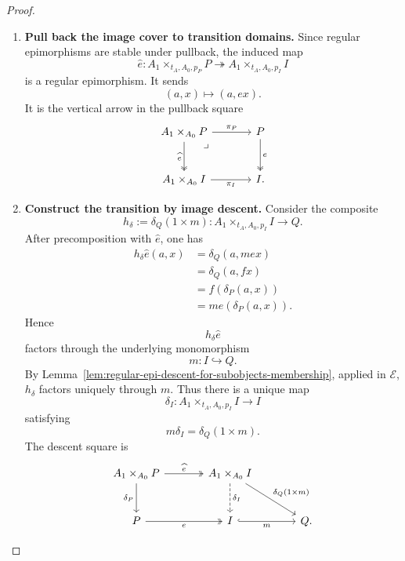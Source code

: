 \begin{proof}
    \leavevmode
    \begin{enumerate}
        \item \textbf{Pull back the image cover to transition domains.}
        Since regular epimorphisms are stable under pullback, the induced map
        \[
            \widehat e:
            A_1\times_{t_A,A_0,p_P}P
            \twoheadrightarrow
            A_1\times_{t_A,A_0,p_I}I
        \]
        is a regular epimorphism. It sends
        \[
            (a,x)\longmapsto(a,ex).
        \]
        It is the vertical arrow in the pullback square
        \[
        \begin{tikzcd}[column sep=large, row sep=large]
            A_1\times_{A_0}P
                \arrow[r, "\pi_P"]
                \arrow[d, two heads, "\widehat e"']
                \arrow[dr, phantom, "\lrcorner", very near start]
            &
            P
                \arrow[d, two heads, "e"]
            \\
            A_1\times_{A_0}I
                \arrow[r, "\pi_I"']
            &
            I .
        \end{tikzcd}
        \]

        \item \textbf{Construct the transition by image descent.}
        Consider the composite
        \[
            h_\delta :=
            \delta_Q(1\times m):
            A_1\times_{t_A,A_0,p_I}I\to Q.
        \]
        After precomposition with \(\widehat e\), one has
        \[
        \begin{aligned}
            h_\delta\widehat e(a,x)
            &=
            \delta_Q(a,mex) \\
            &=
            \delta_Q(a,fx) \\
            &=
            f(\delta_P(a,x)) \\
            &=
            me(\delta_P(a,x)).
        \end{aligned}
        \]
        Hence
        \[
            h_\delta\widehat e
        \]
        factors through the underlying monomorphism
        \[
            m:I\hookrightarrow Q.
        \]
        By Lemma~\ref{lem:regular-epi-descent-for-subobjects-membership}, applied in
        \(\mathcal E\), \(h_\delta\) factors uniquely through \(m\). Thus there
        is a unique map
        \[
            \delta_I:
            A_1\times_{t_A,A_0,p_I}I\to I
        \]
        satisfying
        \[
            m\delta_I
            =
            \delta_Q(1\times m).
        \]
        The descent square is
        \[
        \begin{tikzcd}[column sep=large, row sep=large]
            A_1\times_{A_0}P
                \arrow[r, "\widehat e", two heads]
                \arrow[d, "\delta_P"']
            &
            A_1\times_{A_0}I
                \arrow[d, dashed, "\delta_I"]
                \arrow[dr, "{\delta_Q(1\times m)}"]
            \\
            P
                \arrow[r, two heads, "e"']
            &
            I
                \arrow[r, hook, "m"']
            &
            Q .
        \end{tikzcd}
        \]


\end{enumerate}
\end{proof}
